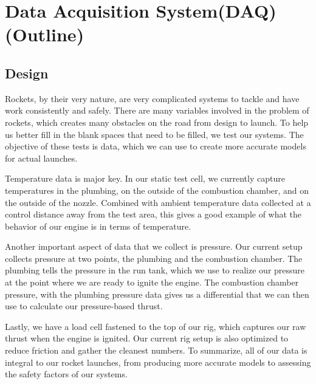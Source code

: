 \documentclass[10pt,a4paper]{article}
\begin{document}
	
\section{Data Acquisition System(DAQ)(Outline)}

\subsection{Design}
\par Rockets, by their very nature, are very complicated systems to tackle and have work consistently and safely. There are many variables involved in the problem of rockets, which creates many obstacles on the road from design to launch. To help us better fill in the blank spaces that need to be filled, we test our systems. The objective of these tests is data, which we can use to create more accurate models for actual launches.
\par Temperature data is major key. In our static test cell, we currently capture temperatures in the plumbing, on the outside of the combustion chamber, and on the outside of the nozzle. Combined with ambient temperature data collected at a control distance away from the test area, this gives a good example of what the behavior of our engine is in terms of temperature.
\par Another important aspect of data that we collect is pressure. Our current setup collects pressure at two points, the plumbing and the combustion chamber. The plumbing tells the pressure in the run tank, which we use to realize our pressure at the point where we are ready to ignite the engine. The combustion chamber pressure, with the plumbing pressure data gives us a differential that we can then use to calculate our pressure-based thrust. 
\par Lastly, we have a load cell fastened to the top of our rig, which captures our raw thrust when the engine is ignited. Our current rig setup is also optimized to reduce friction and gather the cleanest numbers. To summarize, all of our data is integral to our rocket launches, from producing more accurate models to assessing the safety factors of our systems.
\end{document}
